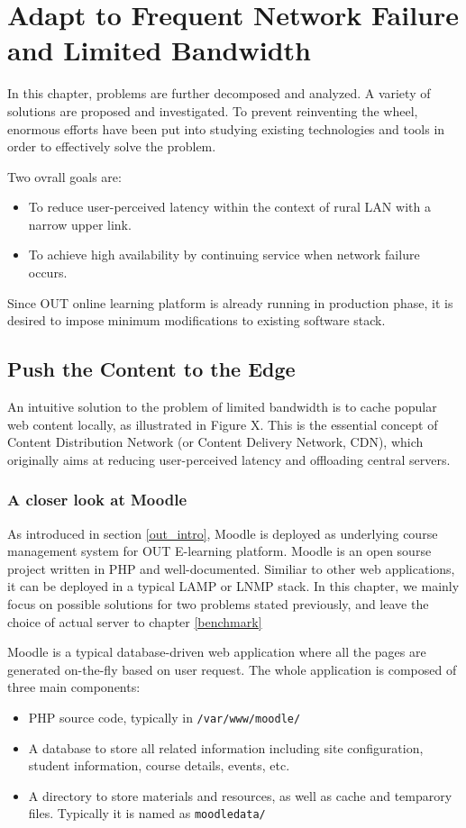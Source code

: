 \chapter{Adapt to Frequent Network Failure and Limited Bandwidth}
In this chapter, problems are further decomposed and analyzed. A variety of solutions are proposed and investigated. To prevent reinventing the wheel, enormous efforts have been put into studying existing technologies and tools in order to effectively solve the problem.

Two ovrall goals are:
\begin{itemize}
\item To reduce user-perceived latency within the context of rural LAN with a narrow upper link.
\item To achieve high availability by continuing service when network failure occurs.
\end{itemize}

Since OUT online learning platform is already running in production phase, it is desired to impose minimum modifications to existing software stack.

\section{Push the Content to the Edge}
An intuitive solution to the problem of limited bandwidth is to cache popular web content locally, as illustrated in Figure X. This is the essential concept of Content Distribution Network (or Content Delivery Network, CDN), which originally aims at reducing user-perceived latency and offloading central servers\cite{dilley2002globally}. 

\subsection{A closer look at Moodle}
As introduced in section \ref{out_intro}, Moodle is deployed as underlying course management system for OUT E-learning platform. Moodle is an open sourse project written in PHP and well-documented\cite{aosamoodle}\cite{moodledoc}. Similiar to other web applications, it can be deployed in a typical LAMP or LNMP stack. In this chapter, we mainly focus on possible solutions for two problems stated previously, and leave the choice of actual server to chapter \ref{benchmark}

Moodle is a typical database-driven web application where all the pages are generated on-the-fly based on user request. The whole application is composed of three main components: 
\begin{itemize}
\item PHP source code, typically in \texttt{/var/www/moodle/}
\item A database to store all related information including site configuration, student information, course details, events, etc.
\item A directory to store materials and resources, as well as cache and temparory files. Typically it is named as \texttt{moodledata/}
\end{itemize}

